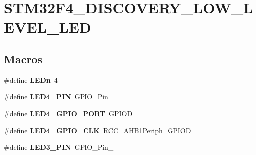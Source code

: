 \hypertarget{group___s_t_m32_f4___d_i_s_c_o_v_e_r_y___l_o_w___l_e_v_e_l___l_e_d}{\section{S\-T\-M32\-F4\-\_\-\-D\-I\-S\-C\-O\-V\-E\-R\-Y\-\_\-\-L\-O\-W\-\_\-\-L\-E\-V\-E\-L\-\_\-\-L\-E\-D}
\label{group___s_t_m32_f4___d_i_s_c_o_v_e_r_y___l_o_w___l_e_v_e_l___l_e_d}
}
\subsection*{Macros}
\begin{DoxyCompactItemize}
\item 
\hypertarget{group___s_t_m32_f4___d_i_s_c_o_v_e_r_y___l_o_w___l_e_v_e_l___l_e_d_gab4be2480bf7d44d52aab1190a65a733c}{\#define {\bfseries L\-E\-Dn}~4}\label{group___s_t_m32_f4___d_i_s_c_o_v_e_r_y___l_o_w___l_e_v_e_l___l_e_d_gab4be2480bf7d44d52aab1190a65a733c}

\item 
\hypertarget{group___s_t_m32_f4___d_i_s_c_o_v_e_r_y___l_o_w___l_e_v_e_l___l_e_d_gaae684bb3d2f940637ccbc2adeb0e134d}{\#define {\bfseries L\-E\-D4\-\_\-\-P\-I\-N}~G\-P\-I\-O\-\_\-\-Pin\-\_}\label{group___s_t_m32_f4___d_i_s_c_o_v_e_r_y___l_o_w___l_e_v_e_l___l_e_d_gaae684bb3d2f940637ccbc2adeb0e134d}

\item 
\hypertarget{group___s_t_m32_f4___d_i_s_c_o_v_e_r_y___l_o_w___l_e_v_e_l___l_e_d_ga6b6f3eb4d23b770de265803afbc2b61b}{\#define {\bfseries L\-E\-D4\-\_\-\-G\-P\-I\-O\-\_\-\-P\-O\-R\-T}~G\-P\-I\-O\-D}\label{group___s_t_m32_f4___d_i_s_c_o_v_e_r_y___l_o_w___l_e_v_e_l___l_e_d_ga6b6f3eb4d23b770de265803afbc2b61b}

\item 
\hypertarget{group___s_t_m32_f4___d_i_s_c_o_v_e_r_y___l_o_w___l_e_v_e_l___l_e_d_gaa9cb3506e5b243b35d234bbdbe7fbab3}{\#define {\bfseries L\-E\-D4\-\_\-\-G\-P\-I\-O\-\_\-\-C\-L\-K}~R\-C\-C\-\_\-\-A\-H\-B1\-Periph\-\_\-\-G\-P\-I\-O\-D}\label{group___s_t_m32_f4___d_i_s_c_o_v_e_r_y___l_o_w___l_e_v_e_l___l_e_d_gaa9cb3506e5b243b35d234bbdbe7fbab3}

\item 
\hypertarget{group___s_t_m32_f4___d_i_s_c_o_v_e_r_y___l_o_w___l_e_v_e_l___l_e_d_ga4cb3ff938bcabb01494ce529ae55a542}{\#define {\bfseries L\-E\-D3\-\_\-\-P\-I\-N}~G\-P\-I\-O\-\_\-\-Pin\-\_}\label{group___s_t_m32_f4___d_i_s_c_o_v_e_r_y___l_o_w___l_e_v_e_l___l_e_d_ga4cb3ff938bcabb01494ce529ae55a542}


\end{DoxyCompactItemize}
